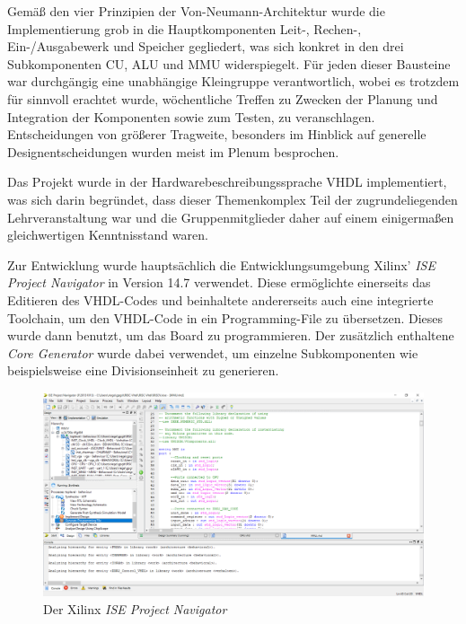 Gem\"a\ss{} den vier Prinzipien der Von-Neumann-Architektur wurde die
Implementierung grob in die Hauptkomponenten Leit-, Rechen-,
Ein-/Ausgabewerk und Speicher gegliedert, was sich konkret in den drei Subkomponenten CU, ALU und MMU widerspiegelt. F\"ur jeden dieser Bausteine
war durchg\"angig eine unabh\"angige Kleingruppe verantwortlich, wobei es
trotzdem f\"ur sinnvoll erachtet wurde, w\"ochentliche Treffen zu Zwecken der
Planung und Integration der Komponenten sowie zum Testen, zu veranschlagen.
Entscheidungen von gr\"o\ss{}erer Tragweite, besonders im Hinblick auf
generelle Designentscheidungen wurden meist im Plenum besprochen.

Das Projekt wurde in der Hardwarebeschreibungssprache VHDL implementiert, was
sich darin begr\"undet, dass dieser Themenkomplex Teil der zugrundeliegenden
Lehrveranstaltung war und die Gruppenmitglieder daher auf einem
einigerma\ss{}en gleichwertigen Kenntnisstand waren.

Zur Entwicklung wurde haupts\"achlich die Entwicklungsumgebung Xilinx'
\textit{ISE Project Navigator} in Version 14.7 verwendet. Diese erm\"oglichte
einerseits das Editieren des VHDL-Codes und beinhaltete andererseits auch eine
integrierte Toolchain, um den VHDL-Code in ein Programming-File zu
\"ubersetzen. Dieses wurde dann benutzt, um das Board zu programmieren. Der
zus\"atzlich enthaltene \textit{Core Generator} wurde dabei verwendet, um
einzelne Subkomponenten wie beispielsweise eine Divisionseinheit zu generieren.

\begin{figure}[H]
\centering
\label{fig:tool}
\includegraphics[width=1.0\textwidth]{ISE.png}
\caption{Der Xilinx \textit{ISE Project Navigator}}
\end{figure}

